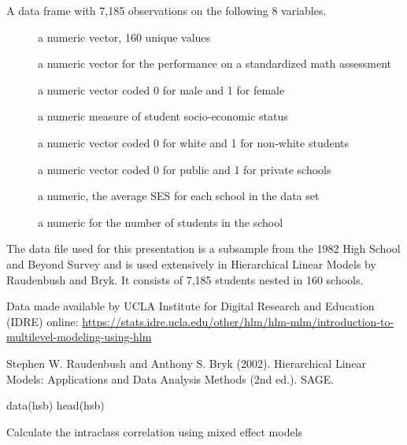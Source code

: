 \documentclass[letterpaper]{book}
\begin{document}
%
\begin{Format}
A data frame with 7,185 observations on the following 8 variables.
\begin{description}

\item[] a numeric vector, 160 unique values
\item[] a numeric vector for the performance on a standardized math assessment
\item[] a numeric vector coded 0 for male and 1 for female
\item[] a numeric measure of student socio-economic status
\item[] a numeric vector coded 0 for white and 1 for non-white students
\item[] a numeric vector coded 0 for public and 1 for private schools
\item[] a numeric, the average SES for each school in the data set
\item[] a numeric for the number of students in the school

\end{description}
\end{Format}
%
\begin{Details}\relax
The data file used for this presentation is a subsample from the
1982 High School and Beyond Survey and is used extensively in
Hierarchical Linear Models by Raudenbush and Bryk. It consists of 7,185 students
nested in 160 schools.
\end{Details}
%
\begin{Source}\relax
Data made available by UCLA Institute for Digital Research and Education
(IDRE) online: \url{https://stats.idre.ucla.edu/other/hlm/hlm-mlm/introduction-to-multilevel-modeling-using-hlm}
\end{Source}
%
\begin{References}\relax
Stephen W. Raudenbush and Anthony S. Bryk (2002). Hierarchical
Linear Models: Applications and Data Analysis Methods (2nd ed.). SAGE.
\end{References}
%
\begin{Examples}
\begin{ExampleCode}
data(hsb)
head(hsb)
\end{ExampleCode}
\end{Examples}
%
\begin{Description}\relax
Calculate the intraclass correlation using mixed effect models
\end{Description}
\end{document}
